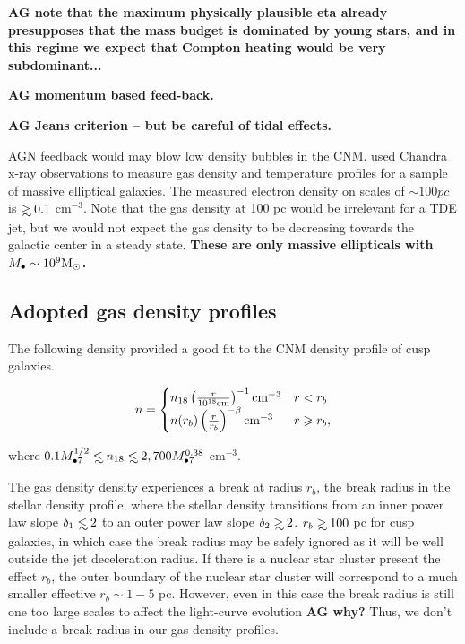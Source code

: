 \documentclass[usenatbib,fleqn]{mnras}
\newcommand\lsim{\mathrel{\rlap{\lower4pt\hbox{\hskip1pt$\sim$}}
    \raise1pt\hbox{$<$}}}
\newcommand\gsim{\mathrel{\rlap{\lower4pt\hbox{\hskip1pt$\sim$}}
    \raise1pt\hbox{$>$}}}
\newcommand{\Mbh}[1][]{M_{\bullet#1}}
\newcommand{\Msun}{{\rm M_\odot}}
\begin{document}
{\bf AG note that the maximum physically plausible eta already
  presupposes that the mass budget is dominated by young stars, and in
this regime we expect that Compton heating would be very
subdominant...}

{\bf AG momentum based feed-back.}


{\bf AG Jeans criterion -- but be careful of tidal effects.}

AGN feedback would may blow low density bubbles in the
CNM. \citet{Russell+2013} used Chandra x-ray observations to measure gas
density and temperature profiles for a sample of massive elliptical
galaxies. The measured electron density on scales of $\sim 100
pc$ is $\gsim 0.1$ cm$^{-3}$. Note that the gas density at 100 pc
would be irrelevant for a TDE jet, but we would not expect the gas
density to be decreasing towards the galactic center in a steady
state. {\bf These are only massive ellipticals with $\Mbh\sim 10^{9} \Msun$.}

\subsection{Adopted gas density profiles}
 The following density provided a good fit to the CNM density profile
 of cusp galaxies.

\begin{align}
n=
\begin{cases}
  n_{18} \left(\frac{r}{10^{18} {\rm cm}}\right)^{-1} {\rm cm^{-3}} & r<r_b \\
  n(r_b) \left(\frac{r}{r_b}\right)^{-\beta} {\rm cm^{-3}} & r\geq
  r_b,\\
  \label{eq:profile}
\end{cases}
\end{align}

where $0.1 \Mbh[7]^{1/2} \lsim n_{\rm 18}\lsim 2,700
\Mbh[7]^{0.38} $ cm$^{-3}$.  

The gas density density experiences a break at radius $r_b$, the break
radius in the stellar density profile, where the stellar density
transitions from an inner power law slope $\delta_1\lsim 2$ to an outer
power law slope $\delta_2\gsim 2$. $r_b\gsim 100$ pc for cusp galaxies,
in which case the break radius may be safely ignored as it will be
well outside the jet deceleration radius. If there is a nuclear
star cluster present the effect $r_b$, the outer boundary of the
nuclear star cluster will correspond to a much smaller effective
$r_b\sim 1-5$ pc. However, even in this case the break radius is still
one too large scales to affect the light-curve evolution {\bf AG why?}
Thus, we don't include a break radius in our gas density profiles.
\end{document}
